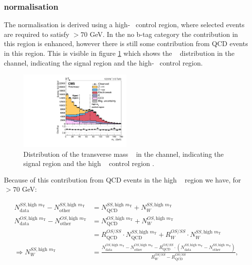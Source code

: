 \subsubsection{\texorpdfstring{\Wjets normalisation}{W+jets normalisation}}
\label{sec:mssm_bkgs_mtet_wjetsnorm}
The \Wjets normalisation is derived using a high-\mT~ control region, where
selected events are required to satisfy \mT$>70$ GeV. In the no b-tag
category the \Wjets
contribution in this region is enhanced, however there is still
some contribution from QCD events in this region. This is visible in 
figure \ref{fig:mssm_bkgs_wjets_mutau_mt} which shows the \mT~ distribution in the
\mutau channel, indicating the signal region and the high-\mT~ control region. 

\begin{figure}[h!]
\begin{center}
\includegraphics[width=0.5\textwidth]{./MSSM/Figures/CMS-PAS-HIG-16-037_Figure_002.pdf}
\end{center}
\caption{Distribution of the transverse mass \mT~ in the \mutau channel, indicating
the signal region and the high \mT~ control region \cite{CMS-PAS-HIG-16-037}.}
\label{fig:mssm_bkgs_wjets_mutau_mt}
\end{figure}

Because of this contribution from QCD events in the high \mT~ region we
have, for \mT$>70$ GeV:

\begin{equation}\label{eqn:wjets_ss_norm}
\begin{split}
N_{\text{data}}^{SS, \text{high } m_{\text{T}}} - N_{\text{other}}^{SS,
\text{high } m_{\text{T}}} & =
N_{\text{QCD}}^{SS, \text{high } m_{\text{T}}} + N_{W}^{SS, \text{high } m_{\text{T}}} ~\\
N_{\text{data}}^{OS, \text{high } m_{\text{T}}} - N_{\text{other}}^{OS,
\text{high } m_{\text{T}}} & = N_{\text{QCD}}^{OS, \text{high } m_{\text{T}}} +
N_{W}^{OS, \text{high } m_{\text{T}}} \\
& = R_{\text{QCD}}^{OS/SS}\cdot N_{\text{QCD}}^{SS, \text{high } m_{\text{T}}} +
R_{W}^{OS/SS} \cdot N_{W}^{SS, \text{high } m_{\text{T}}} ~\\
\Rightarrow N_{W}^{SS, \text{high } m_{\text{T}}}  &= \frac{N_{\text{data}}^{OS,
\text{high } m_{\text{T}}}  - N_{\text{other}}^{OS, \text{high } m_{\text{T}}}  -
R_{\text{QCD}}^{OS/SS}\cdot(N_{\text{data}}^{SS, \text{high } m_{\text{T}}}  -
N_{\text{other}}^{SS, \text{high } m_{\text{T}}} )}{R_{W}^{OS/SS} -
R_{\text{QCD}}^{OS/SS}} ,
\end{split}
\end{equation}

